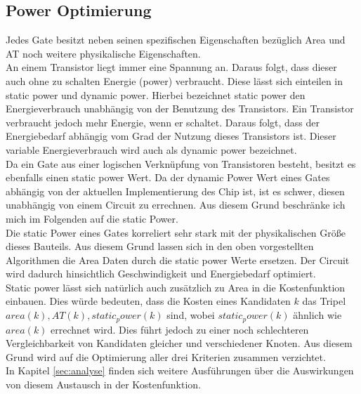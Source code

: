 \documentclass[11pt, a4paper, german]{article}
\begin{document}
\subsection{Power Optimierung}
Jedes Gate besitzt neben seinen spezifischen Eigenschaften bezüglich Area und AT noch weitere physikalische Eigenschaften.\\
An einem Transistor liegt immer eine Spannung an. Daraus folgt, dass dieser auch ohne zu schalten Energie (power) verbraucht. Diese lässt sich einteilen in static power und dynamic power. Hierbei bezeichnet static power den Energieverbrauch unabhängig von der Benutzung des Transistors. Ein Transistor verbraucht jedoch mehr Energie, wenn er schaltet. Daraus folgt, dass der Energiebedarf abhängig vom Grad der Nutzung dieses Transistors ist. Dieser variable Energieverbrauch wird auch als dynamic power bezeichnet.\\
Da ein Gate aus einer logischen Verknüpfung von Transistoren besteht, besitzt es ebenfalls einen static power Wert. Da der dynamic Power Wert eines Gates abhängig von der aktuellen Implementierung des Chip ist, ist es schwer, diesen unabhängig von einem Circuit zu errechnen. Aus diesem Grund beschränke ich mich im Folgenden auf die static Power. \\
Die static Power eines Gates korreliert sehr stark mit der physikalischen Größe dieses Bauteils. Aus diesem Grund lassen sich in den oben vorgestellten Algorithmen die Area Daten durch die static power Werte ersetzen. Der Circuit wird dadurch hinsichtlich Geschwindigkeit und Energiebedarf optimiert. \\
Static power lässt sich natürlich auch zusätzlich zu Area in die Kostenfunktion einbauen. Dies würde bedeuten, dass die Kosten eines Kandidaten $k$ das Tripel $area(k), AT(k), static_power(k)$ sind, wobei $static_power(k)$ ähnlich wie $area(k)$ errechnet wird. Dies führt jedoch zu einer noch schlechteren Vergleichbarkeit von Kandidaten gleicher und verschiedener Knoten. Aus diesem Grund wird auf die Optimierung aller drei Kriterien zusammen verzichtet. \\
In Kapitel \ref{sec:analyse} finden sich weitere Ausführungen über die Auswirkungen von diesem Austausch in der Kostenfunktion.
	
\end{document}
